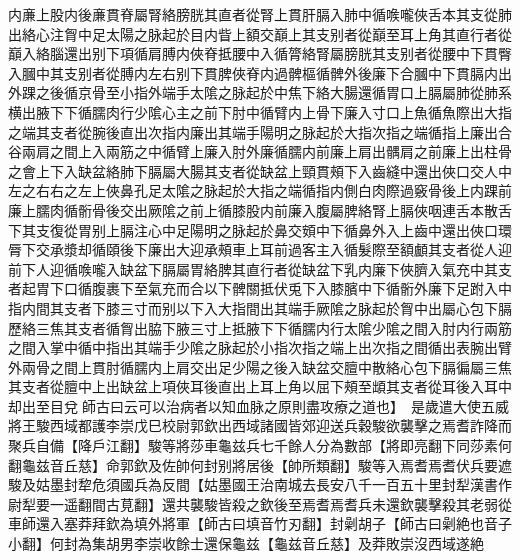 内亷上股内後亷貫脊屬腎絡膀胱其直者從腎上貫肝膈入肺中循㗋嚨俠舌本其支從肺出絡心注胷中足太陽之脉起於目内眥上額交巔上其支别者從巔至耳上角其直行者從巔入絡腦還出别下項循肩膊内俠脊抵腰中入循膂絡腎屬膀胱其支别者從腰中下貫臀入膕中其支别者從膊内左右别下貫脾俠脊内過髀樞循髀外後廉下合膕中下貫膈内出外踝之後循京骨至小指外端手太隂之脉起於中焦下絡大腸還循胃口上膈屬肺從肺系横出腋下下循臑肉行少隂心主之前下肘中循臂内上骨下廉入寸口上魚循魚際出大指之端其支者從腕後直出次指内廉出其端手陽明之脉起於大指次指之端循指上廉出合谷兩肩之間上入兩筋之中循臂上廉入肘外廉循臑内前廉上肩出髃肩之前廉上出柱骨之會上下入缺盆絡肺下膈屬大腸其支者從缺盆上頸貫頰下入齒縫中還出俠口交人中左之右右之左上俠鼻孔足太隂之脉起於大指之端循指内側白肉際過竅骨後上内踝前廉上臑肉循䯒骨後交出厥隂之前上循膝股内前廉入腹屬脾絡腎上膈俠咽連舌本散舌下其支復從胃别上膈注心中足陽明之脉起於鼻交頞中下循鼻外入上齒中還出俠口環脣下交承漿却循頤後下廉出大迎承頰車上耳前過客主入循髮際至額顱其支者從人迎前下人迎循㗋嚨入缺盆下膈屬胃絡脾其直行者從缺盆下乳内廉下俠臍入氣充中其支者起胃下口循腹裹下至氣充而合以下髀關抵伏兎下入膝臏中下循䯒外廉下足跗入中指内間其支者下膝三寸而别以下入大指間出其端手厥隂之脉起於胷中出屬心包下膈歷絡三焦其支者循胷出脇下腋三寸上抵腋下下循臑内行太隂少隂之間入肘内行兩筋之間入掌中循中指出其端手少隂之脉起於小指次指之端上出次指之間循出表腕出臂外兩骨之間上貫肘循臑内上肩交出足少陽之後入缺盆交膻中散絡心包下膈徧屬三焦其支者從膻中上出缺盆上項俠耳後直出上耳上角以屈下頰至䪼其支者從耳後入耳中却出至目兌師古曰云可以治病者以知血脉之原則盡攻療之道也】　是歲遣大使五威將王駿西域都護李崇戊巳校尉郭欽出西域諸國皆郊迎送兵穀駿欲襲擊之焉耆詐降而聚兵自備【降戶江翻】駿等將莎車龜兹兵七千餘人分為數部【將即亮翻下同莎素何翻龜兹音丘慈】命郭欽及佐帥何封别將居後【帥所類翻】駿等入焉耆焉耆伏兵要遮駿及姑墨封犂危須國兵為反間【姑墨國王治南城去長安八千一百五十里封犁漢書作尉犁要一遥翻間古莧翻】還共襲駿皆殺之欽後至焉耆焉耆兵未還欽襲擊殺其老弱從車師還入塞莽拜欽為填外將軍【師古曰填音竹刃翻】封劋胡子【師古曰劋絶也音子小翻】何封為集胡男李崇收餘士還保龜兹【龜兹音丘慈】及莽敗崇沒西域遂絶


